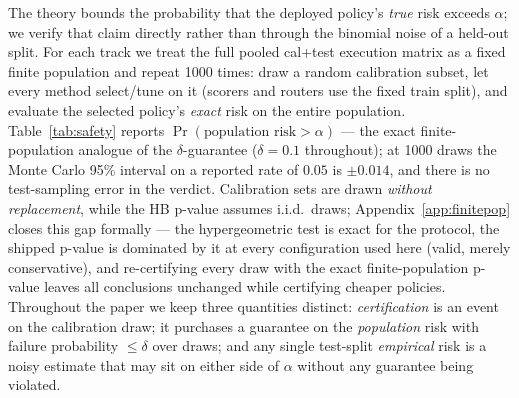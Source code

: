 The theory bounds the probability that the deployed policy's \emph{true}
risk exceeds $\alpha$; we verify that claim directly rather than through
the binomial noise of a held-out split. For each track we treat the full
pooled cal+test execution matrix as a fixed finite population and repeat
1000 times: draw a random calibration subset, let every method
select/tune on it (scorers and routers use the fixed train split), and
evaluate the selected policy's \emph{exact} risk on the entire
population. Table~\ref{tab:safety} reports
$\Pr(\text{population risk} > \alpha)$ --- the exact finite-population
analogue of the $\delta$-guarantee ($\delta = 0.1$ throughout); at 1000
draws the Monte Carlo 95\% interval on a reported rate of $0.05$ is
$\pm 0.014$, and there is no test-sampling error in the verdict.
Calibration sets are drawn \emph{without replacement}, while the HB
p-value assumes i.i.d.\ draws; Appendix~\ref{app:finitepop} closes this
gap formally --- the hypergeometric test is exact for the protocol, the
shipped p-value is dominated by it at every configuration used here
(valid, merely conservative), and re-certifying every draw with the
exact finite-population p-value leaves all conclusions unchanged while
certifying cheaper policies.
Throughout the paper we keep three quantities distinct:
\emph{certification} is an event on the calibration draw; it purchases a
guarantee on the \emph{population} risk with failure probability
$\le \delta$ over draws; and any single test-split \emph{empirical} risk
is a noisy estimate that may sit on either side of $\alpha$ without any
guarantee being violated.

